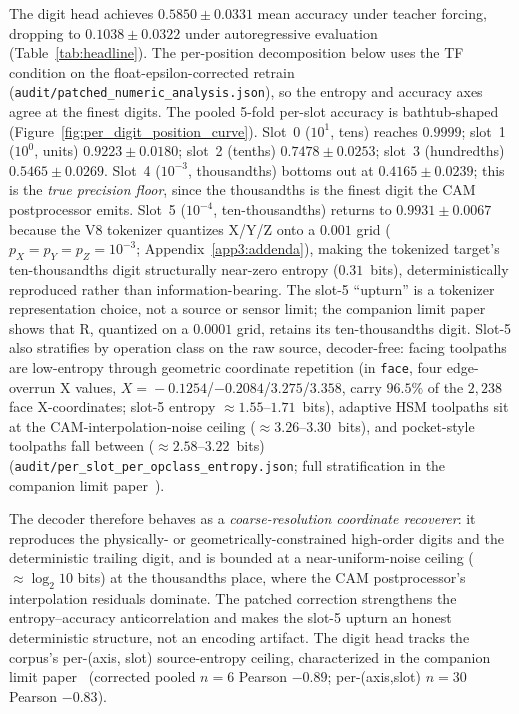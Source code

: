 \documentclass[sensors,article,submit,moreauthors,pdftex]{Definitions/mdpi}
\begin{document}
The digit head achieves $0.5850 \pm 0.0331$ mean accuracy under teacher forcing, dropping to $0.1038 \pm 0.0322$ under autoregressive evaluation (Table~\ref{tab:headline}). The per-position decomposition below uses the TF condition on the float-epsilon-corrected retrain (\texttt{audit/patched\_numeric\_analysis.json}), so the entropy and accuracy axes agree at the finest digits. The pooled 5-fold per-slot accuracy is bathtub-shaped (Figure~\ref{fig:per_digit_position_curve}). Slot~0 ($10^{1}$, tens) reaches $0.9999$; slot~1 ($10^{0}$, units) $0.9223 \pm 0.0180$; slot~2 (tenths) $0.7478 \pm 0.0253$; slot~3 (hundredths) $0.5465 \pm 0.0269$. Slot~4 ($10^{-3}$, thousandths) bottoms out at $0.4165 \pm 0.0239$; this is the \emph{true precision floor}, since the thousandths is the finest digit the CAM postprocessor emits. Slot~5 ($10^{-4}$, ten-thousandths) returns to $0.9931 \pm 0.0067$ because the V8 tokenizer quantizes X/Y/Z onto a $0.001$ grid ($p_X\!=\!p_Y\!=\!p_Z\!=\!10^{-3}$; Appendix~\ref{app3:addenda}), making the tokenized target's ten-thousandths digit structurally near-zero entropy ($0.31$~bits), deterministically reproduced rather than information-bearing. The slot-5 ``upturn'' is a tokenizer representation choice, not a source or sensor limit; the companion limit paper~\cite{paperB_entropy} shows that R, quantized on a $0.0001$ grid, retains its ten-thousandths digit. Slot-5 also stratifies by operation class on the raw source, decoder-free: facing toolpaths are low-entropy through geometric coordinate repetition (in \texttt{face}, four edge-overrun X values, $X\!=\!-0.1254$/$-0.2084$/$3.275$/$3.358$, carry $96.5\%$ of the $2{,}238$ face X-coordinates; slot-5 entropy $\approx\!1.55$--$1.71$~bits), adaptive HSM toolpaths sit at the CAM-interpolation-noise ceiling ($\approx\!3.26$--$3.30$~bits), and pocket-style toolpaths fall between ($\approx\!2.58$--$3.22$~bits) (\texttt{audit/per\_slot\_per\_opclass\_entropy.json}; full stratification in the companion limit paper~\cite{paperB_entropy}).


The decoder therefore behaves as a \emph{coarse-resolution coordinate recoverer}: it reproduces the physically- or geometrically-constrained high-order digits and the deterministic trailing digit, and is bounded at a near-uniform-noise ceiling ($\approx\!\log_2 10$ bits) at the thousandths place, where the CAM postprocessor's interpolation residuals dominate. The patched correction strengthens the entropy--accuracy anticorrelation and makes the slot-5 upturn an honest deterministic structure, not an encoding artifact. The digit head tracks the corpus's per-(axis, slot) source-entropy ceiling, characterized in the companion limit paper~\cite{paperB_entropy} (corrected pooled $n\!=\!6$ Pearson $-0.89$; per-(axis,slot) $n\!=\!30$ Pearson $-0.83$).
\end{document}
